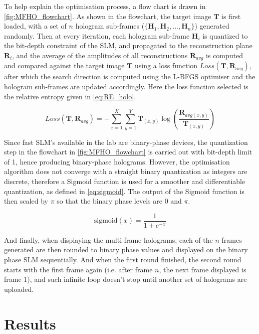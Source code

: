 	To help explain the optimisation process, a flow chart is drawn in \cref{fig:MFHO_flowchart}. As shown in the flowchart, the target image $\textbf{T}$ is first loaded, with a set of $n$ hologram sub-frames ($\{\textbf{H}_1, \textbf{H}_2, ..., \textbf{H}_n\}$) generated randomly. Then at every iteration, each hologram sub-frame $\textbf{H}_i$ is quantized to the bit-depth constraint of the SLM, and propagated to the reconstruction plane $\textbf{R}_i$, and the average of the amplitudes of all reconstructions $\textbf{R}_{avg}$ is computed and compared against the target image $\textbf{T}$ using a loss function $Loss(\textbf{T}, \textbf{R}_{avg})$, after which the search direction is computed using the L-BFGS optimiser and the hologram sub-frames are updated accordingly. Here the loss function selected is the relative entropy\cite{Kullback1951} given in \cref{eq:RE_holo}.

	\begin{equation}
		Loss(\textbf{T}, \textbf{R}_{avg}) = -\sum_{x=1}^{X} \sum_{y=1}^{Y} \textbf{T}_{(x,y)}\log\left(\frac{\textbf{R}_{avg(x,y)}}{\textbf{T}_{(x,y)}}\right)
		\label{eq:RE_holo}
	\end{equation}

	Since fast SLM's available in the lab are binary-phase devices, the quantization step in the flowchart in \cref{fig:MFHO_flowchart} is carried out with bit-depth limit of 1, hence producing binary-phase holograms. However, the optimisation algorithm does not converge with a straight binary quantization as integers are discrete, therefore a Sigmoid function \cite{Bacaer2011} is used for a smoother and differentiable quantization, as defined in \cref{eq:sigmoid}. The output of the Sigmoid function is then scaled by $\pi$ so that the binary phase levels are $0$ and $\pi$.

	\begin{equation}
		\mathrm{sigmoid}(x)=\frac{1}{1+e^{-x}}
		\label{eq:sigmoid}
	\end{equation}

	And finally, when displaying the multi-frame holograms, each of the $n$ frames generated are then rounded to binary phase values and displayed on the binary phase SLM sequentially. And when the first round finished, the second round starts with the first frame again (i.e. after frame $n$, the next frame displayed is frame $1$), and such infinite loop doesn't stop until another set of holograms are uploaded.

\section{Results}

